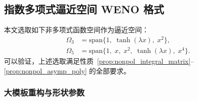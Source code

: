 \documentclass[12pt,a4paper]{article}
\newtheorem{remark}[theorem]{注}
\numberwithin{equation}{section}    %
\begin{document}




\subsection{指数多项式逼近空间 WENO 格式}

本文选取如下非多项式函数空间作为逼近空间：
\begin{equation}
    \begin{aligned}
        \Omega_3 &= \mathrm{span}\bigl\{1,\; \tanh(\lambda x),\; x^2\bigr\},\\
        \Omega_5 &= \mathrm{span}\bigl\{1,\; x,\; x^2,\; \tanh(\lambda x),\; x^4\bigr\}.
    \end{aligned}
\end{equation}
可以验证，上述选取满足性质~\ref{prop:nonpol_integral_matrix}--\ref{prop:nonpol_asymp_poly}
的全部要求。

\subsubsection{大模板重构与形状参数}
\end{document}
